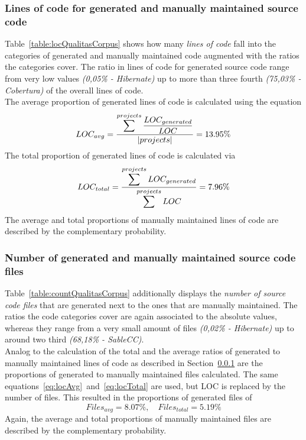 \subsubsection{Lines of code for generated and manually maintained source code}
\label{section:qualitasCorpusLOC}
Table~\ref{table:locQualitasCorpus} shows how many \textit{lines of code} fall into the categories of generated and manually maintained code augmented with the ratios the categories cover. The ratio in lines of code for generated source code range from very low values \textit{(0,05\% - Hibernate)} up to more than three fourth \textit{(75,03\% - Cobertura)} of the overall lines of code.\\
The average proportion of generated lines of code is calculated using the equation
\begin{equation}
	\label{eq:locAvg}
	LOC_{avg} = \frac{\mathlarger{\sum^{projects} \frac{LOC_{generated}}{LOC}}}{|projects|} = 13.95\%
\end{equation}
The total proportion of generated lines of code is calculated via
\begin{equation}
	\label{eq:locTotal}
	LOC_{total} = \frac{\mathlarger{\sum^{projects} LOC_{generated}}}{\mathlarger{\sum^{projects} LOC}} = 7.96\%
\end{equation} 
The average and total proportions of manually maintained lines of code are described by the complementary probability.

\subsubsection{Number of generated and manually maintained source code files}
Table~\ref{table:countQualitasCorpus} additionally displays the \textit{number of source code files} that are generated next to the ones that are manually maintained. The ratios the code categories cover are again associated to the absolute values, whereas they range from a very small amount of files \textit{(0,02\% - Hibernate)} up to around two third \textit{(68,18\% - SableCC)}.\\
Analog to the calculation of the total and the average ratios of generated to manually maintained lines of code as described in Section~\ref{section:qualitasCorpusLOC} are the proportions of generated to manually maintained files calculated. The same equations~\ref{eq:locAvg}~and~\ref{eq:locTotal} are used, but LOC is replaced by the number of files. %
This resulted in the proportions of generated files of
\begin{equation}
	Files_{avg} = 8.07\%, \quad Files_{total} = 5.19\%
\end{equation} 
Again, the average and total proportions of manually maintained files are described by the complementary probability.

